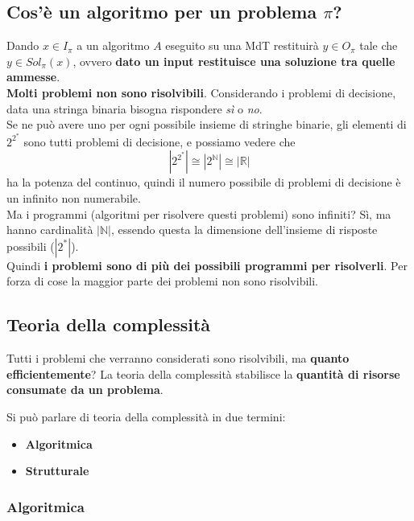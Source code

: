 \newpage

\subsection{Cos'è un algoritmo per un problema $\pi$?}

Dando $x \in I_\pi$ a un algoritmo $A$ eseguito su una MdT restituirà $y \in O_\pi$ tale che $y \in Sol_\pi (x)$, ovvero \textbf{dato un input restituisce una soluzione tra quelle ammesse}.\\

\textbf{Molti problemi non sono risolvibili}. Considerando i problemi di decisione, data una stringa binaria bisogna rispondere \textit{sì} o \textit{no}.\\

Se ne può avere uno per ogni possibile insieme di stringhe binarie, gli elementi di $2^{2^\ast}$ sono tutti problemi di decisione, e possiamo vedere che
$$ |2^{2^\ast}| \cong |2^{\mathbb{N}}| \cong |\mathbb{R}|$$
ha la potenza del continuo, quindi il numero possibile di problemi di decisione è un infinito non numerabile. \\

Ma i programmi (algoritmi per risolvere questi problemi) sono infiniti? Sì, ma hanno cardinalità $|\mathbb{N}|$, essendo questa la dimensione dell'insieme di risposte possibili ($|2^\ast|$).\\

Quindi \textbf{i problemi sono di più dei possibili programmi per risolverli}. Per forza di cose la maggior parte dei problemi non sono risolvibili. \\

\newpage

\subsection{Teoria della complessità}
Tutti i problemi che verranno considerati sono risolvibili, ma \textbf{quanto efficientemente}? La teoria della complessità stabilisce la \textbf{quantità di risorse consumate da un problema}.

Si può parlare di teoria della complessità in due termini:
\begin{itemize}
	\item \textbf{Algoritmica}
	\item \textbf{Strutturale}
\end{itemize}


\subsubsection{Algoritmica}

